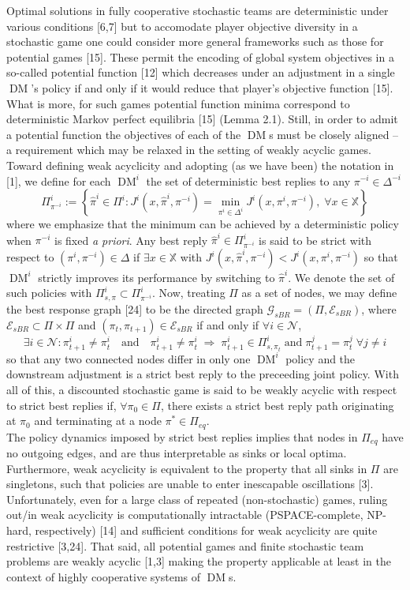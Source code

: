 \documentclass[10pt]{article}
\newcommand{\mbb}[1]{\mathbb{#1}}
\newcommand{\1}[1]{\mathbbm{1}_{#1}}
\newcommand{\mc}[1]{\mathcal{#1}}
\DeclareMathOperator{\DM}{DM}
\begin{document}
Optimal solutions in fully cooperative stochastic teams are deterministic under various conditions [6,7] but to accomodate player objective diversity in a stochastic game one could consider more general frameworks such as those for potential games [15].
These permit the encoding of global system objectives in a so-called potential function [12] which decreases under an adjustment in a single $\DM$'s policy if and only if it would reduce that player's objective function [15]. What is more, for such games potential function minima correspond to deterministic Markov perfect equilibria [15] (Lemma 2.1). Still, in order to admit a potential function the objectives of each of the $\DM$s must be
closely aligned -- a requirement which may be relaxed in the setting of weakly acyclic games.\\[5pt]
Toward defining weak acyclicity and adopting (as we have been) the notation in [1], we define for each $\DM^i$ the set of deterministic best replies to any $\pi^{-i}\in\Delta^{-i}$
\[\Pi^i_{\pi^{-i}}:=\left\{\hat{\pi}^i\in\Pi^i:J^i(x,\hat{\pi}^i,\pi^{-i})=\min_{\pi^i\in\Delta^i}J^i(x,\pi^i,\pi^{-i}),\;\forall x\in\mbb{X}\right\}\tag{3}\]
where we emphasize that the minimum can be achieved by a deterministic policy when $\pi^{-i}$ is fixed {\it a priori}. Any best reply $\hat{\pi}^i\in\Pi^i_{\pi^{-i}}$ is said to be strict with respect to $(\pi^i,\pi^{-i})\in\Delta$ if $\exists x\in\mbb{X}$ with $J^i(x,\hat{\pi}^i,\pi^{-i})<J^i(x,\pi^i,\pi^{-i})$ so that $\DM^i$ strictly improves its performance by switching to $\hat{\pi}^i$.
We denote the set of such policies with $\Pi^i_{s,\pi}\subset\Pi^i_{\pi^{-i}}$. Now, treating $\Pi$ as a set of nodes, we may define the best response graph [24] to be the directed graph $\mc{G}_{sBR}=(\Pi,\mc{E}_{sBR})$, where $\mc{E}_{sBR}\subset\Pi\times\Pi$ and $(\pi_t,\pi_{t+1})\in\mc{E}_{sBR}$ if and only if $\forall i\in\mc{N}$,
\[\exists i\in\mc{N}:\pi^i_{t+1}\neq\pi^i_t\quad\text{and}\quad\pi_{t+1}^i\neq\pi^i_t\;\Rightarrow\;\pi^i_{t+1}\in\Pi^i_{s,\pi_t}\;\text{and}\;\pi^j_{t+1}=\pi^j_t\;\forall j\neq i\]
so that any two connected nodes differ in only one $\DM^i$ policy and the downstream adjustment is a strict best reply to the preceeding joint policy. 
With all of this, a discounted stochastic game is said to be weakly acyclic with respect to strict best replies if, $\forall \pi_0\in\Pi$, there exists a strict best reply path originating at $\pi_0$ and terminating at a node $\pi^\ast\in\Pi_{eq}$.\\[5pt]
The policy dynamics imposed by strict best replies implies that nodes in $\Pi_{eq}$ have no outgoing edges, and are thus interpretable as sinks or local optima. Furthermore, weak acyclicity is equivalent to the property that all sinks in $\Pi$ are singletons,
such that policies are unable to enter inescapable oscillations [3]. Unfortunately, even for a large class of repeated (non-stochastic) games, ruling out/in weak acyclicity is computationally intractable (PSPACE-complete, NP-hard, respectively) [14] and sufficient conditions for weak acyclicity
are quite restrictive [3,24]. That said, all potential games and finite stochastic team problems are weakly acyclic [1,3] making the property applicable at least in the context of highly cooperative systems of $\DM$s.
\end{document}
